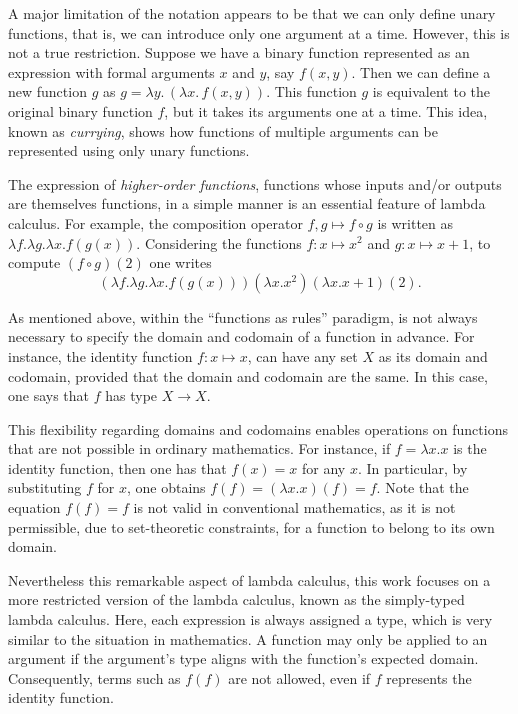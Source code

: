 A major limitation of the notation appears to be that we can only define unary functions, that is, we can introduce only one  argument at a time. However, this is not a true restriction.  Suppose we have a binary function represented as an expression with formal arguments $ x $ and $ y $, say $f(x, y)$. Then we can define a new function $ g $ as $g = \lambda y.\, (\lambda x.\, f(x, y))$.
This function $ g $ is equivalent to the original binary function $ f $, but it takes its arguments one at a time. This idea, known as \emph{currying}, shows how functions of multiple arguments can be represented using only unary functions.

The expression of \emph{higher‑order functions}, functions whose inputs and/or outputs are themselves functions, in a simple manner is an essential feature of lambda calculus. For example, the composition operator $f,g \mapsto f \circ g$ is written as $\lambda f. \lambda g. \lambda x. f(g(x))$. Considering the functions $f:x \mapsto x^2$ and $g:x \mapsto x+1$, to compute $(f \circ g)(2)$ one writes $$(\lambda f. \lambda g. \lambda x. f(g(x)))(\lambda x.x^2)(\lambda x.x+1)(2).$$

As mentioned above,  within  the “functions as rules” paradigm, is not
always necessary to specify the domain and codomain of a function in advance. For instance, the identity function $f: x \mapsto x$, can have any set $X$ as its domain and codomain, provided that the domain and codomain are the same. In this case, one says that $f$ has type $X \rightarrow{} X$.%

This flexibility regarding domains and codomains enables operations on functions that are not possible in ordinary mathematics. For instance, if $f = \lambda x.x$ is the identity function, then one has that $f(x) = x$ for any $x$. In particular, by substituting $f$ for $x$, one obtains $f(f) = (\lambda x.x)(f) = f$. Note that the equation $f(f) = f$ is not valid in conventional mathematics, as it is not permissible, due to set-theoretic constraints, for a function to belong to its own domain.

Nevertheless this remarkable aspect of lambda calculus, this work focuses on a more restricted version of the lambda calculus, known as the simply-typed lambda calculus. Here, each expression is always assigned a type, which is very similar to the situation in mathematics. A function may only be applied to an argument if the argument's type aligns with the function's expected domain. Consequently, terms such as $f(f)$ are not allowed, even if $f$ represents the identity function.

